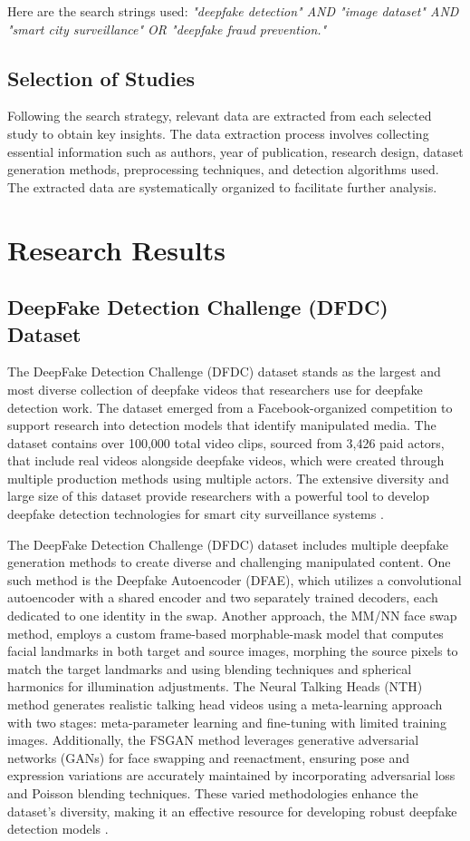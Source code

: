 \documentclass{article} %
\begin{document}
Here are the search strings used:
\textit{"deepfake detection" AND "image dataset" AND "smart city surveillance" OR "deepfake fraud prevention."}

\subsection{Selection of Studies}
Following the search strategy, relevant data are extracted from each selected study to obtain key insights. The data extraction process involves collecting essential information such as authors, year of publication, research design, dataset generation methods, preprocessing techniques, and detection algorithms used. The extracted data are systematically organized to facilitate further analysis.

\section{Research Results}

\subsection{DeepFake Detection Challenge (DFDC) Dataset}
The DeepFake Detection Challenge (DFDC) dataset stands as the largest and most diverse collection of deepfake videos that researchers use for deepfake detection work. The dataset emerged from a Facebook-organized competition to support research into detection models that identify manipulated media. The dataset contains over 100,000 total video clips, sourced from 3,426 paid actors, that include real videos alongside deepfake videos, which were created through multiple production methods using multiple actors. The extensive diversity and large size of this dataset provide researchers with a powerful tool to develop deepfake detection technologies for smart city surveillance systems \cite{dolhansky2020deepfakedetectionchallengedfdc}.

The DeepFake Detection Challenge (DFDC) dataset includes multiple deepfake generation methods to create diverse and challenging manipulated content. One such method is the Deepfake Autoencoder (DFAE), which utilizes a convolutional autoencoder with a shared encoder and two separately trained decoders, each dedicated to one identity in the swap. Another approach, the MM/NN face swap method, employs a custom frame-based morphable-mask model that computes facial landmarks in both target and source images, morphing the source pixels to match the target landmarks and using blending techniques and spherical harmonics for illumination adjustments. The Neural Talking Heads (NTH) method generates realistic talking head videos using a meta-learning approach with two stages: meta-parameter learning and fine-tuning with limited training images. Additionally, the FSGAN method leverages generative adversarial networks (GANs) for face swapping and reenactment, ensuring pose and expression variations are accurately maintained by incorporating adversarial loss and Poisson blending techniques. These varied methodologies enhance the dataset's diversity, making it an effective resource for developing robust deepfake detection models \cite{dolhansky2020deepfakedetectionchallengedfdc}.
\end{document}
